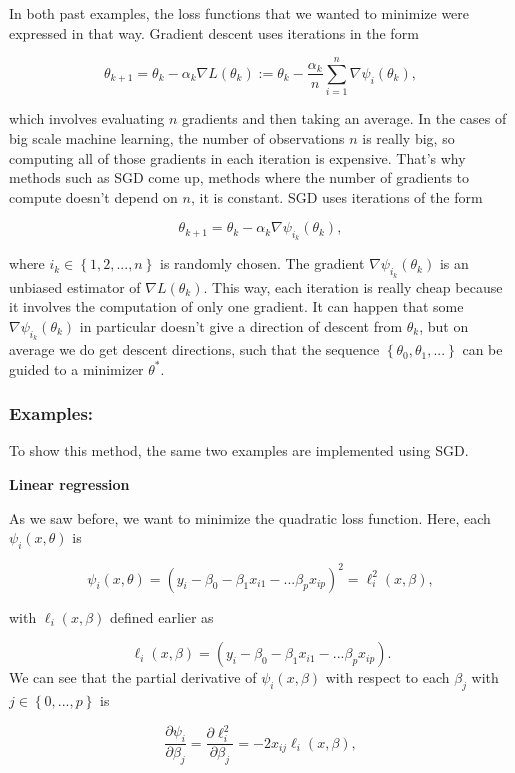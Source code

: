 In both past examples, the loss functions that we wanted to minimize were expressed in that way. Gradient descent uses iterations in the form

\[
\theta_{k+1} = \theta_k - \alpha_k \nabla L(\theta_k) :=\theta_k - \frac{\alpha_k}{n} \sum_{i = 1}^n \nabla \psi_i(\theta_k),
\]

which involves evaluating $n$ gradients and then taking an average. In the cases of big scale machine learning, the number of observations $n$ is really big, so computing all of those gradients in each iteration is expensive. That's why methods such as SGD come up, methods where the number of gradients to compute doesn't depend on $n$, it is constant. SGD uses iterations of the form

\[
\theta_{k+1} = \theta_k - \alpha_k \nabla \psi_{i_k}(\theta_k),
\]

where $i_k \in \left\{1, 2, ..., n \right\}$ is randomly chosen. The gradient $\nabla \psi_{i_k}(\theta_k)$ is an unbiased estimator of $\nabla L(\theta_k)$. This way, each iteration is really cheap because it involves the computation of only one gradient. It can happen that some $\nabla \psi_{i_k}(\theta_k)$ in particular doesn't give a direction of descent from $\theta_k$, but on average we do get descent directions, such that the sequence $\left\{ \theta_0, \theta_1, ... \right\}$ can be guided to a minimizer $\theta^*$.

\subsubsection{Examples: }

To show this method, the same two examples are implemented using SGD.

\textbf{Linear regression}


As we saw before, we want to minimize the quadratic loss function. Here, each $\psi_i(x, \theta)$ is

$$
\psi_i(x, \theta) = \left( y_i - \beta_0 - \beta_1 x_{i1} - ...  \beta_p x_{ip} \right)^2 = \ell_i^2(x, \beta),
$$ 

with $\ell_i(x, \beta)$ defined earlier as

$$
\ell_i(x, \beta) = \left( y_i - \beta_0 - \beta_1 x_{i1} - ...  \beta_p x_{ip} \right).
$$
We can see that the partial derivative of $\psi_i(x, \beta)$ with respect to each $\beta_j$ with $j \in \left\{ 0, ..., p \right\}$ is

\[
\frac{\partial \psi_i}{\partial \beta_j} = \frac{\partial \ell^2_i}{\partial \beta_j} = -2 x_{ij} \ell_i(x, \beta),
\]

